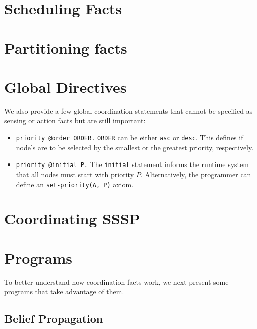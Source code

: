 

\section{Scheduling Facts}\label{sec:fifo}



\section{Partitioning facts}



\section{Global Directives}

We also provide a few global coordination statements that cannot be specified
as sensing or action facts but are still important:

\begin{itemize}

   \item \texttt{priority @order ORDER.} \texttt{ORDER} can be either
      \texttt{asc} or \texttt{desc}. This defines if node's are to be selected
      by the smallest or the greatest priority, respectively.

   \item \texttt{priority @initial P.} The \texttt{initial} statement informs
      the runtime system that all nodes must start with priority $P$.
      Alternatively, the programmer can define an \texttt{set-priority(A, P)}
      axiom.

\end{itemize}

\section{Coordinating SSSP}



\section{Programs}

To better understand how coordination facts work, we next present some programs
that take advantage of them.

\subsection{Belief Propagation}


